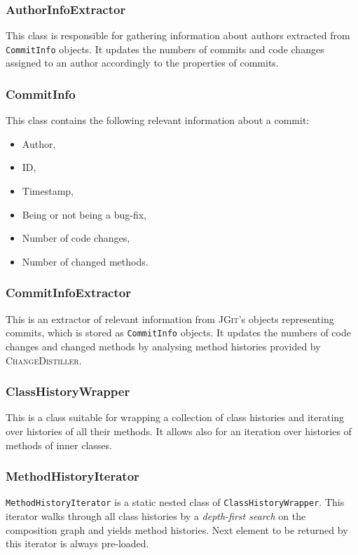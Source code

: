 \documentclass{pracamgr}
\begin{document}
\subsubsection*{AuthorInfoExtractor}
This class is responsible for gathering information about authors extracted from \texttt{CommitInfo} objects. It updates the numbers of commits and code changes assigned to an author accordingly to the properties of commits.

\subsubsection*{CommitInfo}
This class contains the following relevant information about a commit:
\begin{itemize}[noitemsep,topsep=1pt]
	\item Author,
	\item ID,
	\item Timestamp,
	\item Being or not being a bug-fix,
	\item Number of code changes,
	\item Number of changed methods.
\end{itemize}

\subsubsection*{CommitInfoExtractor}
This is an extractor of relevant information from \textsc{JGit}'s objects representing commits, which is stored as \texttt{CommitInfo} objects. It updates the numbers of code changes and changed methods by analysing method histories provided by \textsc{ChangeDistiller}.

\subsubsection*{ClassHistoryWrapper}
This is a class suitable for wrapping a collection of class histories and iterating over histories of all their methods. It allows also for an iteration over histories of methods of inner classes.

\subsubsection*{MethodHistoryIterator}
\texttt{MethodHistoryIterator} is a static nested class of \texttt{ClassHistoryWrapper}. This iterator walks through all class histories by a \emph{depth-first search} on the composition graph and yields method histories. Next element to be returned by this iterator is always pre-loaded.
\end{document}
